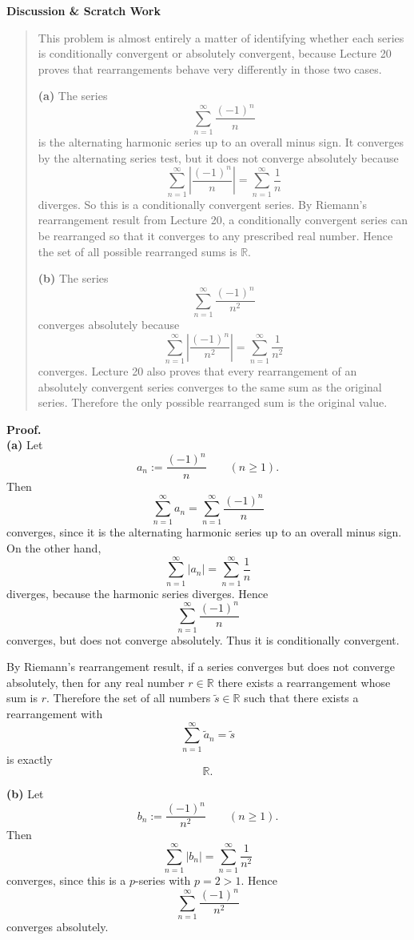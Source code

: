\documentclass[12pt]{article}
\newenvironment{scratch}{%
  \par\smallskip
  \noindent\textbf{Discussion \& Scratch Work}\begin{quote}\small
}{%
  \end{quote}\smallskip
}
\begin{document}
\begin{scratch}
This problem is almost entirely a matter of identifying whether each series is conditionally convergent or absolutely convergent, because Lecture 20 proves that rearrangements behave very differently in those two cases.

\textbf{(a)} The series
\[
\sum_{n=1}^{\infty} \frac{(-1)^n}{n}
\]
is the alternating harmonic series up to an overall minus sign. It converges by the alternating series test, but it does not converge absolutely because
\[
\sum_{n=1}^{\infty} \left|\frac{(-1)^n}{n}\right| = \sum_{n=1}^{\infty} \frac{1}{n}
\]
diverges. So this is a conditionally convergent series. By Riemann's rearrangement result from Lecture 20, a conditionally convergent series can be rearranged so that it converges to any prescribed real number. Hence the set of all possible rearranged sums is $\mathbb{R}$.

\textbf{(b)} The series
\[
\sum_{n=1}^{\infty} \frac{(-1)^n}{n^2}
\]
converges absolutely because
\[
\sum_{n=1}^{\infty} \left|\frac{(-1)^n}{n^2}\right| = \sum_{n=1}^{\infty} \frac{1}{n^2}
\]
converges. Lecture 20 also proves that every rearrangement of an absolutely convergent series converges to the same sum as the original series. Therefore the only possible rearranged sum is the original value.
\end{scratch}

\textbf{Proof.}\\
\textbf{(a)} Let
\[
a_n := \frac{(-1)^n}{n} \qquad (n\ge 1).
\]
Then
\[
\sum_{n=1}^{\infty} a_n = \sum_{n=1}^{\infty} \frac{(-1)^n}{n}
\]
converges, since it is the alternating harmonic series up to an overall minus sign. On the other hand,
\[
\sum_{n=1}^{\infty} |a_n| = \sum_{n=1}^{\infty} \frac{1}{n}
\]
diverges, because the harmonic series diverges. Hence
\[
\sum_{n=1}^{\infty} \frac{(-1)^n}{n}
\]
converges, but does not converge absolutely. Thus it is conditionally convergent.

By Riemann's rearrangement result, if a series converges but does not converge absolutely, then for any real number $r\in\mathbb{R}$ there exists a rearrangement whose sum is $r$. Therefore the set of all numbers $\tilde{s}\in\mathbb{R}$ such that there exists a rearrangement with
\[
\sum_{n=1}^{\infty} \tilde{a}_n = \tilde{s}
\]
is exactly
\[
\mathbb{R}.
\]

\textbf{(b)} Let
\[
b_n := \frac{(-1)^n}{n^2} \qquad (n\ge 1).
\]
Then
\[
\sum_{n=1}^{\infty} |b_n| = \sum_{n=1}^{\infty} \frac{1}{n^2}
\]
converges, since this is a $p$-series with $p=2>1$. Hence
\[
\sum_{n=1}^{\infty} \frac{(-1)^n}{n^2}
\]
converges absolutely.
\end{document}
